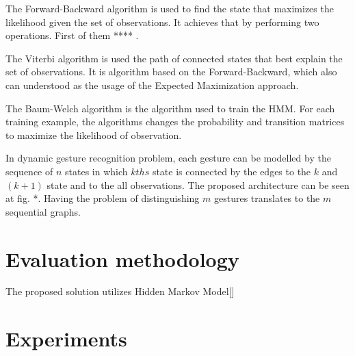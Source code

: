 The Forward-Backward algorithm is used to find the state that maximizes the likelihood given the set of observations.
It achieves that by performing two operations. First of them **** .

The Viterbi algorithm is used the path of connected states that best explain the set of observations. 
It is algorithm based on the Forward-Backward, which also can understood as the usage of the Expected Maximization approach.

The Baum-Welch algorithm is the algorithm used to train the HMM.
For each training example, the algorithms changes the probability and transition matrices to maximize the likelihood of observation.

In dynamic gesture recognition problem, each gesture can be modelled by the sequence of $n$ states in which $kths$ state is connected by the edges to the $k$ and $(k+1)$ state and to the all observations.
The proposed architecture can be seen at fig. *. 
Having the problem of distinguishing $m$ gestures translates to the $m$ sequential graphs.







\section{Evaluation methodology}







  






The proposed solution utilizes Hidden Markov Model[] 



\section{Experiments}
